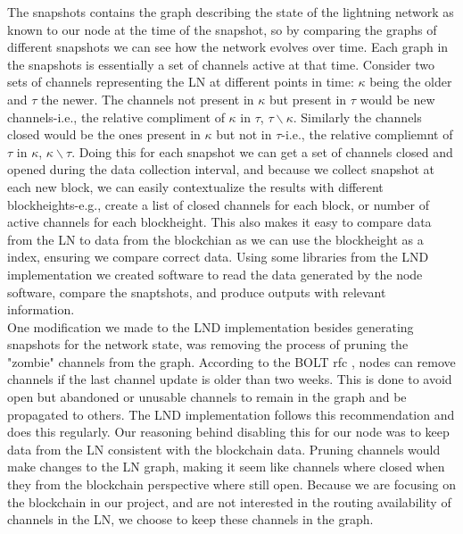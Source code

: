 The snapshots contains the graph describing the state of the lightning network as known to our node at the time of the snapshot, so by comparing the graphs of different snapshots we can see how the network evolves over time. 
Each graph in the snapshots is essentially a set of channels active at that time. Consider two sets of channels representing the LN at different points in time: \(\kappa\) being the older and \(\tau\) the newer. The channels not present in \(\kappa\) but present in \(\tau\) would be new channels-i.e., the relative compliment of \(\kappa\) in \(\tau\), \( \tau \backslash{}\kappa\). Similarly the channels closed would be the ones present in \(\kappa\) but not in \(\tau\)-i.e., the relative compliemnt of \(\tau\) in \(\kappa\), \(\kappa\backslash{}\tau\). Doing this for each snapshot we can get a set of channels closed and opened during the data collection interval, and because we collect snapshot at each new block, we can easily contextualize the results with different blockheights-e.g., create a list of closed channels for each block, or number of active channels for each blockheight. This also makes it easy to compare data from the LN to data from the blockchian as we can use the blockheight as a index, ensuring we compare correct data.
Using some libraries from the LND implementation we created software to read the data generated by the node software, compare the snaptshots, and produce outputs with relevant information.
\\


One modification we made to the LND implementation besides generating snapshots for the network state, was removing the process of pruning the "zombie" channels from the graph. According to the BOLT rfc \cite{bolt7}, nodes can remove channels if the last channel update is older than two weeks. This is done to avoid open but abandoned or unusable channels to remain in the graph and be propagated to others. The LND implementation follows this recommendation and does this regularly. Our reasoning behind disabling this for our node was to keep data from the LN consistent with the blockchain data. Pruning channels would make changes to the LN graph, making it seem like channels where closed when they from the blockchain perspective where still open. Because we are focusing on the blockchain in our project, and are not interested in the routing availability of channels in the LN, we choose to keep these channels in the graph.

